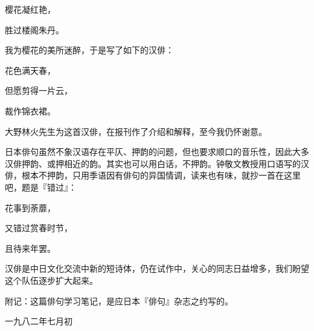 {    \begin{center}
        樱花凝红艳，

        胜过楼阁朱丹。
    \end{center}

    我为樱花的美所迷醉，于是写了如下的汉俳：

    \begin{center}
        花色满天春，

        但愿剪得一片云，

        裁作锦衣裙。
    \end{center}

    大野林火先生为这首汉俳，在报刊作了介绍和解释，至今我仍怀谢意。

    日本俳句虽然不象汉语存在平仄、押韵的问题，但也要求顺口的音乐性，因此大多汉俳押韵、或押相近的韵。其实也可以用白话，不押韵。钟敬文教授用口语写的汉俳，根本不押韵，只用季语因有俳句的异国情调，读来也有味，就抄一首在这里吧，题是『错过』：

    \begin{center}
        花事到荼蘼，

        又错过赏春时节，

        且待来年罢。
    \end{center}

    汉俳是中日文化交流中新的短诗体，仍在试作中，关心的同志日益增多，我们盼望这个队伍逐步扩大起来。

    \bigskip

    附记：这篇俳句学习笔记，是应日本『俳句』杂志之约写的。

    \hfill 一九八二年七月初
}
